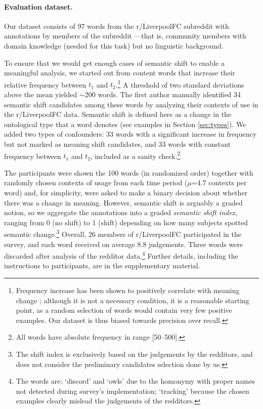

\paragraph{Evaluation dataset.}

Our dataset consists of 97 words from the r/LiverpoolFC subreddit with
annotations by members of the subreddit ---that is, community members
with domain knowledge (needed for this task) but no linguistic
background.

To ensure that we would get enough cases of semantic shift to enable a
meaningful analysis, we started out from content words that increase
their relative frequency between $t_1$ and $t_2$.\footnote{Frequency
  increase has been shown to positively correlate with meaning change
  \cite{wijaya2011understanding,kulkarni2015statistically}; although
  it is not a necessary condition, it is a reasonable starting point,
  as a random selection of words would contain very few positive
  examples. Our dataset is thus biased towards precision over recall.}
A threshold of two standard deviations above the mean yielded
$\sim$200 words. The first author manually identified 34 semantic
shift candidates among these words by analyzing their contexts of use
in the r/LiverpoolFC data.  Semantic shift is defined here as a change
in the ontological type that a word denotes (see examples in
Section \ref{sec:types}). We added two types of confounders: 33 words
with a significant increase in frequency but not marked as meaning
shift candidates, and 33 words with constant frequency between $t_1$
and $t_2$, included as a sanity check.\footnote{All words have
  absolute frequency in range [50--500].}

The participants were shown the 100 words (in randomized order)
together with randomly chosen contexts of usage from each time period
($\mu$=4.7 contexts per word) and, for simplicity, were asked to make
a binary decision about whether there was a change in
meaning. However, semantic shift is arguably a graded notion, so we
aggregate the annotations into a graded \emph{semantic shift index},
ranging from 0 (no shift) to 1 (shift) depending on how many subjects
spotted semantic change.\footnote{The shift index is exclusively based
  on the judgements by the redditors, and does not consider the
  preliminary candidates selection done by us.}  Overall, 26 members
of r/LiverpoolFC participated in the survey, and each word received on
average 8.8 judgements. Three words were discarded after analysis of
the redditor data.\footnote{The words are: `discord' and `owls' due to
  the homonymy with proper names not detected during survey's
  implementation; `tracking' because the chosen examples clearly
  mislead the judgements of the redditors.}  Further details,
including the instructions to participants, are in the supplementary
material.

